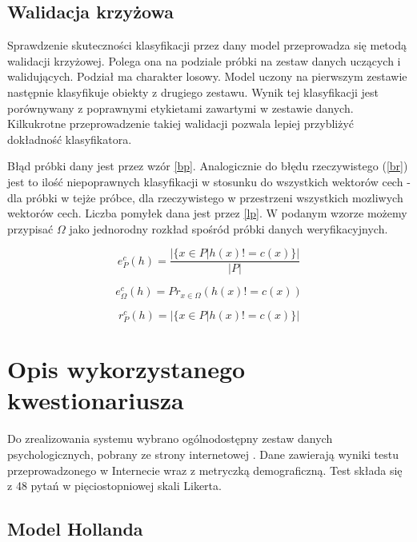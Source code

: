 \documentclass[12pt,a4paper,oneside]{report} %
\begin{document}
\section{Walidacja krzyżowa}

Sprawdzenie skuteczności klasyfikacji przez dany model przeprowadza się metodą walidacji krzyżowej. Polega ona na podziale próbki na zestaw danych uczących i walidujących. Podział ma charakter losowy. Model uczony na pierwszym zestawie następnie klasyfikuje obiekty z drugiego zestawu. Wynik tej klasyfikacji jest porównywany z poprawnymi etykietami zawartymi w zestawie danych. Kilkukrotne przeprowadzenie takiej walidacji pozwala lepiej przybliżyć dokładność klasyfikatora.\par

Błąd próbki dany jest przez wzór \ref{bp}. Analogicznie do błędu rzeczywistego (\ref{br}) jest to ilość niepoprawnych klasyfikacji w stosunku do wszystkich wektorów cech - dla próbki w tejże próbce, dla rzeczywistego w przestrzeni wszystkich mozliwych wektorów cech. Liczba pomyłek dana jest przez \ref{lp}. W podanym wzorze możemy przypisać $\Omega$ jako jednorodny rozkład spośród próbki danych weryfikacyjnych.


\begin{equation}
e_P^c(h) = \frac{| \{ x \in P | h(x) != c(x) \} |}{|P|}
\end{equation}
\label{bp}

\begin{equation}
e_\Omega^c (h) = Pr_{x \in \Omega}(h(x) != c(x))
\end{equation}
\label{bp}

\begin{equation}
r_P^c(h) = | \{ x \in P | h(x) != c(x) \} | 
\end{equation}
\label{lp}

\chapter{Opis wykorzystanego kwestionariusza}

Do zrealizowania systemu wybrano ogólnodostępny zestaw danych psychologicznych, pobrany ze strony internetowej \cite{raw_data}. Dane zawierają wyniki testu przeprowadzonego w Internecie wraz z metryczką demograficzną. Test składa się z 48 pytań w pięciostopniowej skali Likerta.\par

\section{Model Hollanda}
\end{document}

